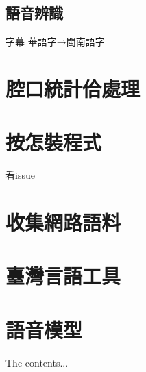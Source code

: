 \documentclass[final,oneside,onecolumn,12pt,a4paper]{book}%
\begin{document}
\section{語音辨識}
\label{節：未來辨識}
字幕 華語字→閩南語字




\begin{appendices}
\chapter{腔口統計佮處理}
\label{章：腔口統計佮處理}
\chapter{按怎裝程式}
\label{章：按怎裝程式}
看issue
\chapter{收集網路語料}
\label{章：收集網路語料}
\chapter{臺灣言語工具}
\label{章：臺灣言語工具}
\chapter{語音模型}
\label{章：語音模型}
The contents...
\end{appendices}
\end{document}
